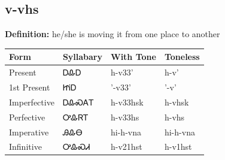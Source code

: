 \documentclass{article}%
\begin{document}
\subsection*{v-vhs}%
\textbf{Definition: }%
he/she is moving it from one place to another%
\\[0.5em]%
\begin{tabular}{|l|l|l|l|}%
\hline%
\textbf{Form}&\textbf{Syllabary}&\textbf{With Tone}&\textbf{Toneless}\\%
\hline%
Present&ᎠᎲᎠ&h{-}v33'&h{-}v'\\%
1st Present&ᏥᎥᎠ&'{-}v33'&'{-}v'\\%
Imperfective&ᎠᎲᏍᎪᎢ&h{-}v33hsk&h{-}vhsk\\%
Perfective&ᎤᎲᏒᎢ&h{-}v33hs&h{-}vhs\\%
Imperative&ᎯᎲᎾ&hi{-}h{-}vna&hi{-}h{-}vna\\%
Infinitive&ᎤᎲᏍᏗ&h{-}v21hst&h{-}v1hst\\%
\hline%
\end{tabular}%
\\[1em]%
\end{document}
